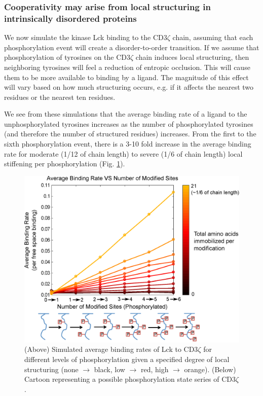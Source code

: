\documentclass[../../AdvancementSummary.tex]{subfiles}
\begin{document}
\subsubsection{Cooperativity may arise from local structuring in intrinsically disordered proteins}

We now simulate the kinase Lck binding to the CD3$\zeta$ chain, assuming that each phosphorylation event will create a disorder-to-order transition. If we assume that phosphorylation of tyrosines on the CD3$\zeta$ chain induces local structuring, then neighboring tyrosines will feel a reduction of entropic occlusion. This will cause them to be more available to binding by a ligand. The magnitude of this effect will vary based on how much structuring occurs, e.g. if it affects the nearest two residues or the nearest ten residues. 

We see from these simulations that the average binding rate of a ligand to the unphosphorylated tyrosines increases as the number of phosphorylated tyrosines (and therefore the number of structured residues) increases. From the first to the sixth phosphorylation event, there is a 3-10 fold increase in the average binding rate for moderate (1/12 of chain length) to severe (1/6 of chain length) local stiffening per phosphorylation (Fig. \ref{fig: StiffeningMemOnCoop}).


\begin{figure}[H]
	\begin{center}
		\includegraphics[width=0.8\linewidth]{ResultsFigures/CD3ZetaStiffeningMembraneOn/AvgBindVSTotalPhosColorMapLabeled.eps}
		\caption{(Above) Simulated average binding rates of Lck to CD3$\zeta$ for different levels of phosphorylation given a specified degree of local structuring (none $\rightarrow$ black, low $\rightarrow$ red, high $\rightarrow$ orange). (Below) Cartoon representing a possible phosphorylation state series of CD3$\zeta$. \label{fig: StiffeningMemOnCoop}}
	\end{center}
\end{figure}
\end{document}
